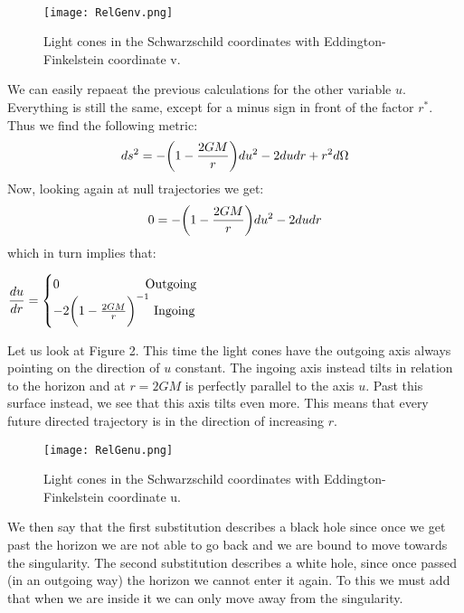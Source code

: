 \documentclass[]{article}
\theoremstyle{definition}
\theoremstyle{Theorem}
\theoremstyle{definition}
\theoremstyle{definition}
\theoremstyle{definition}
\begin{document}
\\
\begin{center}
	\begin{figure}[h!]
		\centering
		\texttt{[image: RelGenv.png]}
		\caption{Light cones in the Schwarzschild coordinates with Eddington-Finkelstein coordinate v.}
	\end{figure}
\end{center}
We can easily repaeat the previous calculations for the other variable $u$. Everything is still the same, except for a minus sign in front of the factor $r^*$. Thus we find the following metric:
$$ds^2=-\bigg(1-{2GM\over r}\bigg)du^2-2dudr+r^2d\Omega$$
Now, looking again at null trajectories we get:
$$0=-\bigg(1-{2GM\over r}\bigg)du^2-2dudr$$
which in turn implies that:
\begin{center}
	\begin{math}
		\displaystyle {du\over dr}=
		\begin{cases}
			0 \mbox{\hspace{68pt}Outgoing}\\
			-2\bigg(1-{2GM\over r}\bigg)^{-1} \mbox{  Ingoing}
		\end{cases}
	\end{math}
\end{center}
Let us look at Figure 2. This time the light cones have the outgoing axis always pointing on the direction of $u$ constant. The ingoing axis instead tilts in relation to the horizon and at $r=2GM$ is perfectly parallel to the axis $u$. Past this surface instead, we see that this axis tilts even more. This means that every future directed trajectory is in the direction of increasing $r$.
\begin{center}
	\begin{figure}[h!]
		\centering
		\texttt{[image: RelGenu.png]}
		\caption{Light cones in the Schwarzschild coordinates with Eddington-Finkelstein coordinate u.}
	\end{figure}
\end{center}
We then say that the first substitution describes a black hole since once we get past the horizon we are not able to go back and we are bound to move towards the singularity. The second substitution describes a white hole, since once passed (in an outgoing way) the horizon we cannot enter it again. To this we must add that when we are inside it we can only move away from the singularity.\\
\\
\end{document}

